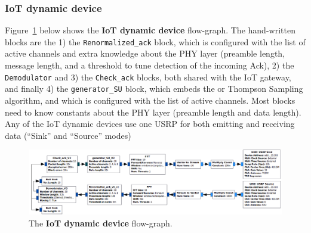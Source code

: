 \subsubsection*{IoT dynamic device}

Figure~\ref{fig:4app:USRP_TX_SU__v1__simple_grc} below shows the \textbf{IoT dynamic device} flow-graph.
The hand-written blocks are the
1) the \texttt{Renormalized\_ack} block, which is configured with the list of active channels and extra knowledge about the PHY layer (preamble length, message length, and a threshold to tune detection of the incoming Ack),
2) the \texttt{Demodulator} and 3) the \texttt{Check\_ack} blocks, both shared with the IoT gateway,
and finally 4) the \texttt{generator\_SU} block, which embeds the \UCB{} or Thompson Sampling algorithm, and which is configured with the list of active channels. Most blocks need to know constants about the PHY layer (preamble length and data length). Any of the IoT dynamic devices use one USRP for both emitting and receiving data (``Sink'' and ``Source'' modes)

\begin{figure}[!h]
	\centering
    \includegraphics[width=1.00\textwidth]{2-Chapters/4-Chapter/Images/USRP_TX_SU__v1__simple_grc.png}
    \caption{The \textbf{IoT dynamic device} flow-graph.}
    \label{fig:4app:USRP_TX_SU__v1__simple_grc}
\end{figure}